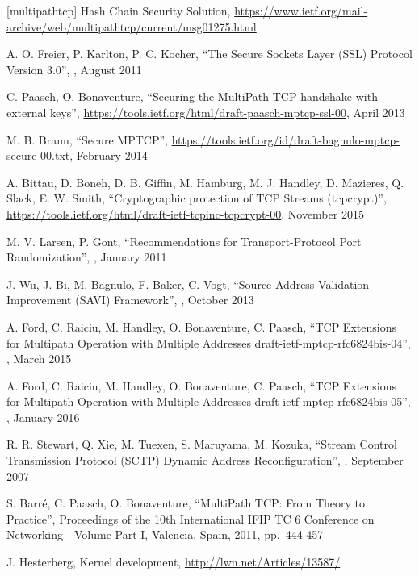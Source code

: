 \begin{thebibliography}{99}
[multipathtcp] Hash Chain Security Solution, 
\url{https://www.ietf.org/mail-archive/web/multipathtcp/current/msg01275.html}

A. O. Freier, P. Karlton, P. C. Kocher,
``The Secure Sockets Layer (SSL) Protocol Version 3.0'',
,  August 2011

C. Paasch, O. Bonaventure,
``Securing the MultiPath TCP handshake with external keys'',
\url{https://tools.ietf.org/html/draft-paasch-mptcp-ssl-00}, 
April 2013

M. B. Braun,
``Secure MPTCP'',
\url{https://tools.ietf.org/id/draft-bagnulo-mptcp-secure-00.txt}, 
February 2014

A. Bittau, D. Boneh, D. B. Giffin, M. Hamburg, M. J. Handley, D. Mazieres, Q. Slack, E. W. Smith,
``Cryptographic protection of TCP Streams (tcpcrypt)'',
\url{https://tools.ietf.org/html/draft-ietf-tcpinc-tcpcrypt-00}, 
November 2015

M. V. Larsen, P. Gont,
``Recommendations for Transport-Protocol Port Randomization'',
,  January 2011

J. Wu, J. Bi, M. Bagnulo, F. Baker, C. Vogt,
``Source Address Validation Improvement (SAVI) Framework'',
,  October 2013

A. Ford, C. Raiciu, M. Handley, O. Bonaventure, C. Paasch,
``TCP Extensions for Multipath Operation with Multiple Addresses draft-ietf-mptcp-rfc6824bis-04'',
,  March 2015

A. Ford, C. Raiciu, M. Handley, O. Bonaventure, C. Paasch,
``TCP Extensions for Multipath Operation with Multiple Addresses draft-ietf-mptcp-rfc6824bis-05'',
,  January 2016

R. R. Stewart, Q. Xie, M. Tuexen, S. Maruyama, M. Kozuka,
``Stream Control Transmission Protocol (SCTP) Dynamic Address Reconfiguration'',
,  September 2007

S. Barr{\'e}, C. Paasch, O. Bonaventure, 
``MultiPath TCP: From Theory to Practice'',
Proceedings of the 10th International IFIP TC 6 Conference on Networking - Volume Part I,
Valencia, Spain, 2011, 
pp.\ 444-457

J. Hesterberg, Kernel development,
\url{http://lwn.net/Articles/13587/}


\end{thebibliography}
